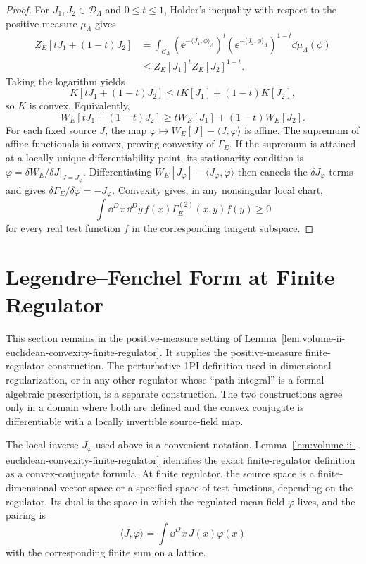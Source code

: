 \begin{proof}
For \(J_1,J_2\in\mathcal D_\Lambda\) and \(0\le t\le1\), Holder's inequality
with respect to the positive measure \(\mu_\Lambda\) gives
\[
\begin{aligned}
  Z_E[tJ_1+(1-t)J_2]
  &=
  \int_{\mathcal C_\Lambda}
  \left(
    \ee^{-\langle J_1,\phi\rangle_\Lambda}
  \right)^t
  \left(
    \ee^{-\langle J_2,\phi\rangle_\Lambda}
  \right)^{1-t}
  \dd\mu_\Lambda(\phi)          \\
  &\le
  Z_E[J_1]^t Z_E[J_2]^{1-t}.
\end{aligned}
\]
Taking the logarithm yields
\[
  K[tJ_1+(1-t)J_2]
  \le
  tK[J_1]+(1-t)K[J_2],
\]
so \(K\) is convex.  Equivalently,
\[
  W_E[tJ_1+(1-t)J_2]
  \ge
  tW_E[J_1]+(1-t)W_E[J_2].
\]
For each fixed source \(J\), the map
\(\varphi\mapsto W_E[J]-\langle J,\varphi\rangle\) is affine.  The supremum of
affine functionals is convex, proving convexity of \(\Gamma_E\).  If the
supremum is attained at a locally unique differentiability point, its
stationarity condition is
\(\varphi=\delta W_E/\delta J|_{J=J_\varphi}\).  Differentiating
\(W_E[J_\varphi]-\langle J_\varphi,\varphi\rangle\) then cancels the
\(\delta J_\varphi\) terms and gives
\(\delta\Gamma_E/\delta\varphi=-J_\varphi\).  Convexity gives, in any
nonsingular local chart,
\[
  \int \dd^Dx\,\dd^Dy\,
  f(x)\Gamma_E^{(2)}(x,y)f(y)\ge0
\]
for every real test function \(f\) in the corresponding tangent subspace.
\end{proof}

\section{Legendre--Fenchel Form at Finite Regulator}

This section remains in the positive-measure setting of
Lemma~\ref{lem:volume-ii-euclidean-convexity-finite-regulator}.  It supplies
the positive-measure finite-regulator construction.  The perturbative 1PI
definition used in dimensional regularization, or in any other regulator whose
``path integral'' is a formal algebraic prescription, is a separate
construction.  The two constructions agree only in a domain where both are
defined and the convex conjugate is differentiable with a locally invertible
source-field map.

The local inverse \(J_{\varphi}\) used above is a convenient notation.
Lemma~\ref{lem:volume-ii-euclidean-convexity-finite-regulator} identifies the
exact finite-regulator definition as a convex-conjugate formula.  At finite
regulator, the source space is a finite-dimensional vector space or a specified
space of test functions, depending on the regulator.  Its dual is
the space in which the regulated mean field \(\varphi\) lives, and the pairing is
\[
  \langle J,\varphi\rangle
  =
  \int \dd^Dx\,J(x)\varphi(x)
\]
with the corresponding finite sum on a lattice.

